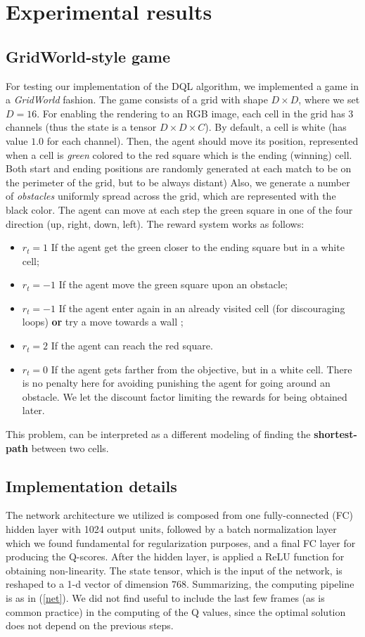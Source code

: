 \documentclass{article}
\begin{document}
\section{Experimental results}
\subsection{GridWorld-style game}
For testing our implementation of the DQL algorithm, we implemented a game in a \textit{GridWorld} fashion. The game consists of a grid with shape $D \times D$, where we set $D = 16$. For enabling the rendering to an RGB image, each cell in the grid has $3$ channels (thus the state is a tensor $D \times D \times C$). By default, a cell is white (has value $1.0$ for each channel). Then, the agent should move its position, represented when a cell is \textit{green} colored to the red square which is the ending (winning) cell. Both start and ending positions are randomly generated at each match to be on the perimeter of the grid, but to be always distant)  Also, we generate a number of \textit{obstacles} uniformly spread across the grid, which are represented with the black color. The agent can move at each step the green square in one of the four direction (up, right, down, left).
The reward system works as follows:
\begin{itemize}
	\item $r_t = 1$ If the agent get the green closer to the ending square but in a white cell;
	\item $r_t = -1$ If the agent move the green square upon an obstacle;
	\item $r_t = -1$ If the agent enter again in an already visited cell (for discouraging loops) \textbf{or} try a move towards a wall ;
	\item $r_t = 2$ If the agent can reach the red square.
	\item $r_t = 0$ If the agent gets farther from the objective, but in a white cell. There is no penalty here for avoiding punishing the agent for going around an obstacle. We let the discount factor limiting the rewards for being obtained later.
\end{itemize}
This problem, can be interpreted as a different modeling of finding the \textbf{shortest-path} between two cells.

\subsection{Implementation details}
The network architecture we utilized is composed from one fully-connected (FC) hidden layer with 1024 output units, followed by a batch normalization layer which we found fundamental for regularization purposes, and a final FC layer for producing the Q-scores. After the hidden layer, is applied a ReLU function for obtaining non-linearity. The state tensor, which is the input of the network, is reshaped to a 1-d vector of dimension $768$. Summarizing, the computing pipeline is as in (\ref{net}). We did not find useful to include the last few frames (as is common practice) in the computing of the Q values, since the optimal solution does not depend on the previous steps.
\end{document}

